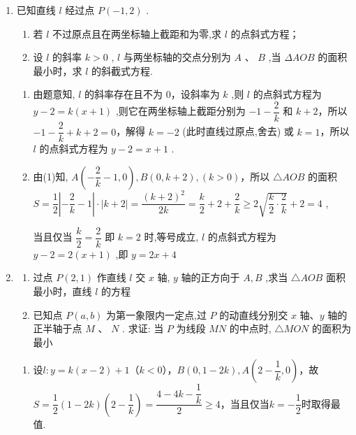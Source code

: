 \begin{enumerate}
    \item 已知直线 $l$ 经过点 $P\left( {-1,2}\right)$ .
    \begin{enumerate}
        \item 若 $l$ 不过原点且在两坐标轴上截距和为零,求 $l$ 的点斜式方程；
        \item 设 $l$ 的斜率 $k > 0$ , $l$ 与两坐标轴的交点分别为 ${A}$ 、 $B$ ,当 ${\Delta AOB}$ 的面积最小时，求 $l$ 的斜截式方程.
    \end{enumerate}
    \begin{jieda}
        \begin{enumerate}
            \item 由题意知, $l$ 的斜率存在且不为 0，设斜率为 $k$ ,则 $l$ 的点斜式方程为 $y - 2 = k\left( {x + 1}\right)$ ,则它在两坐标轴上截距分别为 $- 1 - \dfrac{2}{k}$ 和 $k + 2$，所以 $- 1 - \dfrac{2}{k} + k + 2 = 0$，解得 $k =  - 2$ (此时直线过原点,舍去) 或 $k = 1$，所以 $l$ 的点斜式方程为 $y - 2 = x + 1$ .
            \item 由(1)知, $A\left( {-\dfrac{2}{k} - 1,0}\right) ,B\left( {0,k + 2}\right) ,\left( {k > 0}\right)$，所以 $\triangle{AOB}$ 的面积 $S = \dfrac{1}{2}\left| {-\dfrac{2}{k} - 1}\right|  \cdot  \left| {k + 2}\right|  = \dfrac{{\left( k + 2\right) }^{2}}{2k} = \dfrac{k}{2} + 2 + \dfrac{2}{k} \geq  2\sqrt{\dfrac{k}{2} \cdot \dfrac{2}{k}} + 2 = 4$ ,

            当且仅当 $\dfrac{k}{2} = \dfrac{2}{k}$ 即 $k = 2$ 时,等号成立, $l$ 的点斜式方程为 $y - 2 = 2\left( {x + 1}\right)$ ,即 $y = {2x} + 4$
        \end{enumerate}
    \end{jieda}
    
    \item \begin{enumerate}
        \item 过点 $P\left( {2,1}\right)$ 作直线 $l$ 交 $x$ 轴, $y$ 轴的正方向于 $A,B$ ,求当 $\bigtriangleup {AOB}$ 面积最小时，直线 $l$ 的方程
        \item 已知点 $P\left( {a,b}\right)$ 为第一象限内一定点,过 $P$ 的动直线分别交 $x$ 轴、$y$ 轴的正半轴于点 $M\text{ 、 }N$ . 求证: 当 $P$ 为线段 ${MN}$ 的中点时, $\bigtriangleup {MON}$ 的面积为最小
    \end{enumerate}
    \begin{jieda}
        \begin{enumerate}
            \item 设$l: y = k(x-2)+1$（$k < 0$），$B(0, 1-2k), A\left(2-\dfrac{1}{k}, 0\right)$，故$S = \dfrac{1}{2}(1-2k)\left(2-\dfrac{1}{k}\right) = \dfrac{4-4k-\dfrac{1}{k}}{2} \geq 4$，当且仅当$k = -\dfrac{1}{2}$时取得最值.


\end{enumerate}
\end{jieda}
\end{enumerate}
